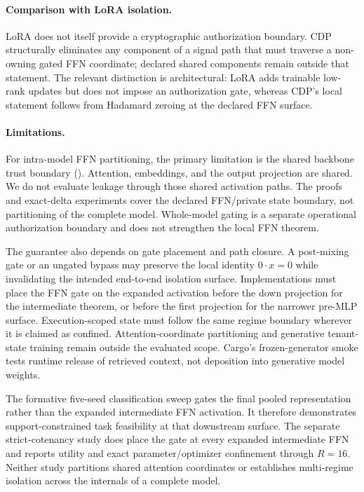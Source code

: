 \documentclass[11pt,a4paper]{article}
\begin{document}
\paragraph{Comparison with LoRA isolation.}
LoRA does not itself provide a cryptographic authorization boundary.
CDP structurally eliminates any component of a signal path that must
traverse a non-owning gated FFN coordinate; declared shared
components remain outside that statement.
The relevant distinction is architectural: LoRA adds trainable
low-rank updates but does not impose an authorization gate, whereas
CDP's local statement follows from Hadamard zeroing at the declared
FFN surface.

\paragraph{Limitations.}
For intra-model FFN partitioning, the primary limitation is the shared
backbone trust boundary ().  Attention,
embeddings, and the output projection are shared.  We do not evaluate
leakage through those shared activation paths.  The proofs and
exact-delta experiments cover the declared FFN/private state boundary,
not partitioning of the complete model.  Whole-model gating is a
separate operational authorization boundary and does not strengthen
the local FFN theorem.

The guarantee also depends on gate placement and path closure.  A
post-mixing gate or an ungated bypass may preserve the local identity
$0\cdot x=0$ while invalidating the intended end-to-end isolation
surface.  Implementations must place the FFN gate on the expanded
activation before the down projection for the intermediate theorem,
or before the first projection for the narrower pre-MLP surface.
Execution-scoped state must
follow the same regime boundary wherever it is claimed as confined.
Attention-coordinate partitioning and generative tenant-state
training remain outside the evaluated scope.  Cargo's frozen-generator
smoke tests runtime release of retrieved context, not deposition into
generative model weights.

The formative five-seed classification sweep gates the final pooled
representation rather than the expanded intermediate FFN activation.
It therefore demonstrates support-constrained task feasibility at
that downstream surface.  The separate strict-cotenancy study does
place the gate at every expanded intermediate FFN and reports utility
and exact parameter/optimizer confinement through $R{=}16$.
Neither study partitions shared attention coordinates or establishes
multi-regime isolation across the internals of a complete model.
\end{document}
